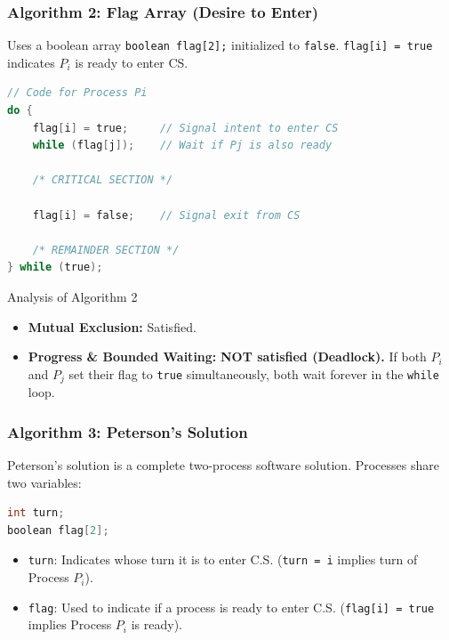 \documentclass[10pt,a4paper]{article}
\begin{document}
\clearpage
\subsubsection{Algorithm 2: Flag Array (Desire to Enter)}
Uses a boolean array \texttt{boolean flag[2];} initialized to \texttt{false}. \texttt{flag[i] = true} indicates $P_i$ is ready to enter CS.

\begin{lstlisting}[language=C]
// Code for Process Pi
do {
    flag[i] = true;     // Signal intent to enter CS
    while (flag[j]);    // Wait if Pj is also ready
    
    /* CRITICAL SECTION */
    
    flag[i] = false;    // Signal exit from CS
    
    /* REMAINDER SECTION */
} while (true);
\end{lstlisting}

\begin{alertbox}{Analysis of Algorithm 2}
\begin{itemize}
    \item \textbf{Mutual Exclusion:} Satisfied.
    \item \textbf{Progress \& Bounded Waiting:} \textbf{NOT satisfied (Deadlock).} If both $P_i$ and $P_j$ set their flag to \texttt{true} simultaneously, both wait forever in the \texttt{while} loop.
\end{itemize}
\end{alertbox}

\subsubsection{Algorithm 3: Peterson's Solution}
Peterson's solution is a complete two-process software solution. Processes share two variables:
\begin{lstlisting}[language=C]
int turn;
boolean flag[2];
\end{lstlisting}
\begin{itemize}
    \item \texttt{turn}: Indicates whose turn it is to enter C.S. (\texttt{turn = i} implies turn of Process $P_i$).
    \item \texttt{flag}: Used to indicate if a process is ready to enter C.S. (\texttt{flag[i] = true} implies Process $P_i$ is ready).
\end{itemize}
\end{document}
